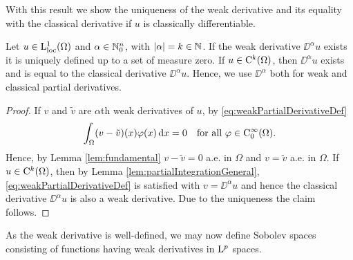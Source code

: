 With this result we show the uniqueness of the weak derivative and its equality with the classical derivative if $u$ is classically differentiable.

\begin{lem}
  Let $u \in \mathrm{L}_{\operatorname{loc}}^1(\Omega)$ and $\alpha \in \mathbb{N}_0^n$, with $|\alpha| = k \in \mathbb{N}$. 
  If the weak derivative $\DD^\alpha u$ exists it is uniquely defined up to a set of measure zero.
  If $u \in \mathrm{C}^k(\Omega)$, then $\DD^\alpha u$ exists and is equal to the classical derivative $\DD^\alpha u$. 
  Hence, we use $\DD^\alpha$ both for weak and classical partial derivatives.
\end{lem}

\begin{proof}
  If $v$ and $\tilde v$ are $\alpha$th weak derivatives of $u$, by \eqref{eq:weakPartialDerivativeDef}
  $$
  \int_\Omega (v - \tilde v) (x) \varphi(x) \, {\operatorname{d}\!{x}} = 0 \quad\text{for all } \varphi \in \mathrm{C}_0^\infty(\Omega).
  $$
  Hence, by Lemma \ref{lem:fundamental} $v - \tilde v = 0$ a.e. in $\Omega$ and $v = \tilde v$ a.e. in $\Omega$.
  If $u \in \mathrm{C}^k(\Omega)$, then by Lemma \ref{lem:partialIntegrationGeneral}, \eqref{eq:weakPartialDerivativeDef} is satisfied with $v = \DD^\alpha u$ and hence the classical derivative $\DD^\alpha u$ is also a weak derivative.
  Due to the uniqueness the claim follows.
\end{proof}

As the weak derivative is well-defined, we may now define Sobolev spaces consisting of functions having weak derivatives in $\mathrm{L}^p$ spaces.


